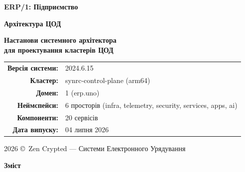 \documentclass{article}
\newcommand\HUGE[1]{\fontsize{38}{38}\selectfont #1}
\begin{document}
\pagestyle{fancy}

\begin{titlepage}
\AddToShipoutPictureBG*{\AtPageLowerLeft{\color{primary}\rule{\paperwidth}{\paperheight}}}
\color{white}\thispagestyle{empty}\vspace*{3cm}\centering
  {\Huge \textbf{ERP/1: Підприємство} \par} \vspace{1.5cm}
  {\HUGE \textbf{Архітектура ЦОД} \par} \vspace{2cm}
  {\LARGE \textbf{Настанови системного архітектора \\для проектування кластерів ЦОД} \par}
  \vspace{1.5cm}
  \begin{tabular}{rl}
    \textbf{Версія системи:}  & 2024.6.15 \\[4pt]
    \textbf{Кластер:}         & synrc-control-plane (arm64) \\[4pt]
    \textbf{Домен:}           & 1 (erp.uno)\\[4pt]
    \textbf{Неймспейси:}      & 6 просторів (infra, telemetry, security, services, apps, ai) \\[4pt]
    \textbf{Компоненти:}      & 20 сервісів \\[4pt]
    \textbf{Дата випуску:}    & 04 липня 2026 \\
  \end{tabular}
\vfill
  {\large 2026 \copyright\ Zen Crypted --- Системи Електронного Урядування \par}
\end{titlepage}

\newpage
\begin{center}
  {\Huge\color{primary}\bfseries Зміст\par}
\end{center}
\vspace{40pt}
\tableofcontents

\begin{abstract}
Технічний блюпрінт ЦОД.
\end{abstract}
\end{document}
